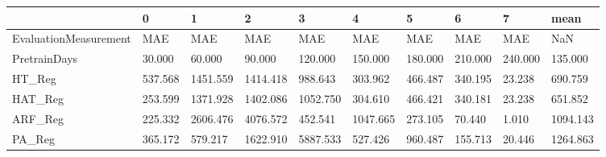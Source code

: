 \begin{tabular}{llllllllll}
\toprule
{} &       0 &        1 &        2 &        3 &        4 &       5 &       6 &       7 &     mean \\
\midrule
EvaluationMeasurement &     MAE &      MAE &      MAE &      MAE &      MAE &     MAE &     MAE &     MAE &      NaN \\
PretrainDays          &  30.000 &   60.000 &   90.000 &  120.000 &  150.000 & 180.000 & 210.000 & 240.000 &  135.000 \\
HT\_Reg                & 537.568 & 1451.559 & 1414.418 &  988.643 &  303.962 & 466.487 & 340.195 &  23.238 &  690.759 \\
HAT\_Reg               & 253.599 & 1371.928 & 1402.086 & 1052.750 &  304.610 & 466.421 & 340.181 &  23.238 &  651.852 \\
ARF\_Reg               & 225.332 & 2606.476 & 4076.572 &  452.541 & 1047.665 & 273.105 &  70.440 &   1.010 & 1094.143 \\
PA\_Reg                & 365.172 &  579.217 & 1622.910 & 5887.533 &  527.426 & 960.487 & 155.713 &  20.446 & 1264.863 \\
\bottomrule
\end{tabular}
